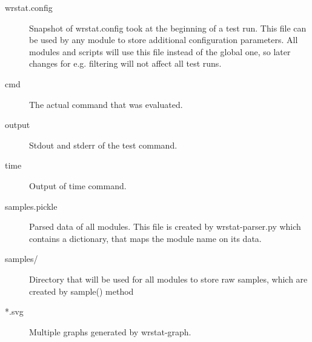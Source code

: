     \begin{description}
        \item[wrstat.config]
            Snapshot of wrstat.config took at the beginning
            of a test run.
            This file can be used by any module to store
            additional configuration parameters.
            All modules and scripts will use this file
            instead of the global one, so later changes
            for e.g. filtering will not affect all test runs.
        \item[cmd]
            The actual command that was evaluated.
        \item[output]
            Stdout and stderr of the test command.
        \item[time]
            Output of time command.
        \item[samples.pickle]
            Parsed data of all modules. This file is created by 
            wrstat-parser.py which contains a dictionary, that
            maps the module name on its data.
        \item[samples/]
            Directory that will be used for all modules to store raw
            samples, which are created by sample() method
        \item[*.svg]
            Multiple graphs generated by wrstat-graph.
    \end{description}


